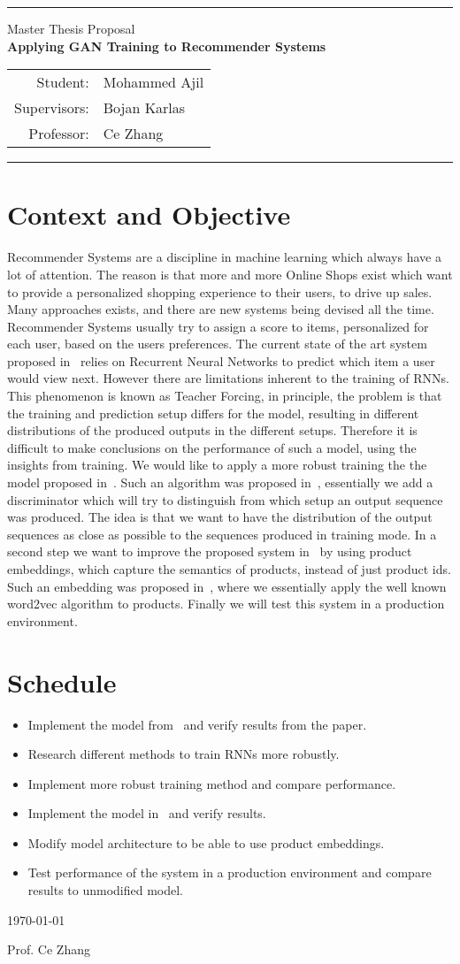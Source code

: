 \documentclass[12pt]{scrartcl}
\makeatletter
\renewcommand{\maketitle}
  {\setlength{\unitlength}{1mm}
  \begin{minipage}{\textwidth}
    \ETHlogo[55mm]\hfill%
  \end{minipage}
  \begin{center}
    {\color{Gray} \rule{.8\textwidth}{.5pt}}
  \end{center}
  \begin{center}
    {\Large Master Thesis Proposal}\\
    \vspace{10pt}
    {\huge \textbf {Applying GAN Training to Recommender Systems}}\\
    \vspace{7pt}
    \begin{tabular}{rl}
      Student: & Mohammed Ajil \\
      Supervisors: &  Bojan Karlas \\
      Professor: & Ce Zhang \\
    \end{tabular}
    \vspace{-2pt}
  \end{center}

  \begin{center}
    {\color{Gray} \rule{.8\textwidth}{.5pt}}
  \end{center}
}
\makeatother
\begin{document}
\maketitle

\section{Context and Objective}
Recommender Systems are a discipline in machine learning which always have a lot of attention. The reason is that more and more Online Shops exist which want to provide a personalized shopping experience to their users, to drive up sales.
%
Many approaches exists, and there are new systems being devised all the time.
%
Recommender Systems usually try to assign a score to items, personalized for each user, based on the users preferences.
%
The current state of the art system proposed in~\cite{hierarchical} relies on Recurrent Neural Networks to predict which item a user would view next.
%
However there are limitations inherent to the training of RNNs.
%
This phenomenon is known as Teacher Forcing, in principle, the problem is that the training and prediction setup differs for the model, resulting in different distributions of the produced outputs in the different setups.
%
Therefore it is difficult to make conclusions on the performance of such a model, using the insights from training.
%
We would like to apply a more robust training the the model proposed in~\cite{hierarchical}.
%
Such an algorithm was proposed in~\cite{profforce}, essentially we add a discriminator which will try to distinguish from which setup an output sequence was produced.
%
The idea is that we want to have the distribution of the output sequences as close as possible to the sequences produced in training mode.
%
In a second step we want to improve the proposed system in~\cite{hierarchical} by using product embeddings, which capture the semantics of products, instead of just product ids.
%
Such an embedding was proposed in~\cite{prod2vec}, where we essentially apply the well known word2vec algorithm to products.
%
Finally we will test this system in a production environment.
%
\section{Schedule}
%
\begin{itemize}
 \item Implement the model from~\cite{hierarchical} and verify results from the paper.
 \item Research different methods to train RNNs more robustly.
 \item Implement more robust training method and compare performance.
 \item Implement the model in~\cite{prod2vec} and verify results.
 \item Modify model architecture to be able to use product embeddings.
 \item Test performance of the system in a production environment and compare results to unmodified model.
\end{itemize}





\vfill

\hfill \today

\hfill Prof. Ce Zhang
\end{document}
